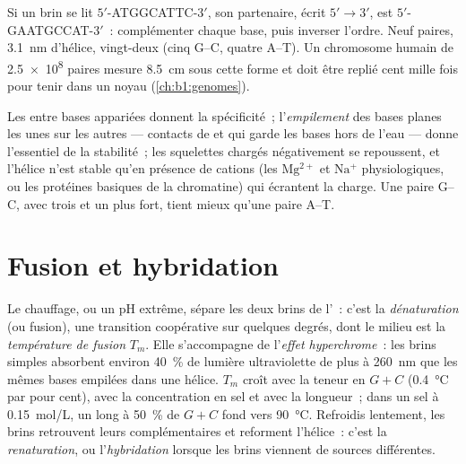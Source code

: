\begin{example}\label{ex:b1:nucleic-acids:complement}
Si un brin se lit $5'$-ATGGCATTC-$3'$, son partenaire, écrit
$5' \to 3'$, est $5'$-GAATGCCAT-$3'$~: complémenter chaque base, puis
inverser l'ordre. Neuf paires, \qty{3.1}{nm} d'hélice, vingt-deux
 (cinq G--C, quatre A--T). Un chromosome humain de
\num{2.5e8} paires mesure \qty{8.5}{cm} sous cette forme et doit être
replié cent mille fois pour tenir dans un noyau (\cref{ch:b1:genomes}).
\end{example}

\begin{proposition}\label{prop:b1:nucleic-acids:stability}
Les  entre bases appariées donnent la spécificité~;
l'\emph{empilement} des bases planes les
unes sur les autres --- contacts de  et 
qui garde les bases hors de l'eau --- donne l'essentiel de la
stabilité~; les squelettes chargés négativement se repoussent, et
l'hélice n'est stable qu'en présence de cations (les $\mathrm{Mg^{2+}}$
et $\mathrm{Na^+}$ physiologiques, ou les protéines basiques de la
chromatine) qui écrantent la charge. Une paire G--C, avec trois  et un  plus fort, tient mieux qu'une paire A--T.
\end{proposition}

\section{Fusion et hybridation}

\begin{definition}\label{def:b1:nucleic-acids:melting}
Le chauffage, ou un pH extrême, sépare les deux brins de l'~: c'est
la \emph{dénaturation} (ou fusion), une
transition coopérative sur quelques degrés, dont le milieu est la
\emph{température de fusion} $T_m$. Elle
s'accompagne de l'\emph{effet hyperchrome}~: les brins simples absorbent
environ \qty{40}{\%} de lumière ultraviolette de plus à \qty{260}{nm}
que les mêmes bases empilées dans une hélice. $T_m$ croît avec la teneur
en $G + C$ (\qty{0.4}{\celsius} par pour cent), avec la concentration en
sel et avec la longueur~; dans un sel à \qty{0.15}{mol/L}, un long  à
\qty{50}{\%} de $G + C$ fond vers \qty{90}{\celsius}. Refroidis
lentement, les brins retrouvent leurs complémentaires et reforment
l'hélice~: c'est la \emph{renaturation}, ou l'\emph{hybridation}
lorsque les brins viennent de sources différentes.
\end{definition}

